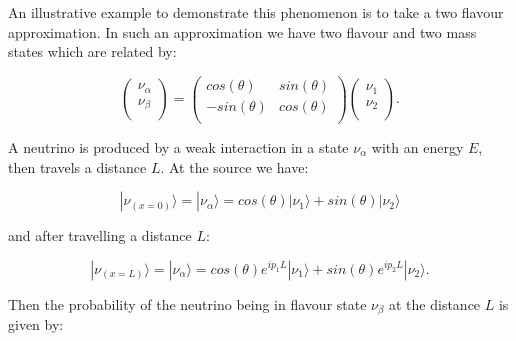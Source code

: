 An illustrative example to demonstrate this phenomenon is to take a two flavour approximation. In such an approximation we have two flavour and two mass states which are related by:

\begin{equation}
  \begin{pmatrix}
    \nu_{\alpha} \\
    \nu_{\beta} \\
  \end{pmatrix}
  =
  \begin{pmatrix}
    cos(\theta) & sin(\theta) \\
    -sin(\theta) & cos(\theta) \\
  \end{pmatrix}
  \begin{pmatrix}
    \nu_{1} \\
    \nu_{2} \\
  \end{pmatrix}.
  \label{eq:particle-physics:neutrino-oscillation-two-flavour}
\end{equation}

A neutrino is produced by a weak interaction in a state $\nu_{\alpha}$ with an energy $E$, then travels a distance $L$. At the source we have:

\begin{equation}
  |\nu_{(x=0)} \rangle = |\nu_{\alpha} \rangle = cos(\theta) |\nu_{1}\rangle + sin(\theta) |\nu_{2}\rangle
\end{equation}

and after travelling a distance $L$:

\begin{equation}
  |\nu_{(x=L)} \rangle = |\nu_{\alpha} \rangle = cos(\theta) e^{ip_{1}L} |\nu_{1}\rangle + sin(\theta) e^{ip_{2}L} |\nu_{2}\rangle.
\end{equation}

Then the probability of the neutrino being in flavour state $\nu_{\beta}$ at the distance $L$ is given by:

